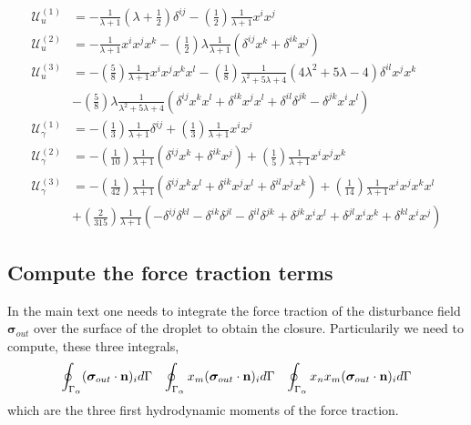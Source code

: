 \begin{align*}
    \mathcal{U}_{u}^{(1)}
    &=
    -\frac{1}{\lambda + 1}\left(\lambda + \frac{1}{2}\right)\delta^{ij} - \left(\frac{1}{2}\right)\frac{1}{\lambda + 1}x{}^{i}x{}^{j}
    \\ \mathcal{U}_{u}^{(2)}
    &=
    -\frac{1}{\lambda + 1}x{}^{i}x{}^{j}x{}^{k}  - \left(\frac{1}{2}\right)\lambda\frac{1}{\lambda + 1}(\delta^{ij}x{}^{k} + \delta^{ik}x{}^{j})
    \\ \mathcal{U}_{u}^{(3)}
    &=
    - \left(\frac{5}{8}\right)\frac{1}{\lambda + 1}x{}^{i}x{}^{j}x{}^{k}x{}^{l} 
    - \left(\frac{1}{8}\right)\frac{1}{\lambda^{2} + 5 \lambda + 4}\left(4 \lambda^{2} + 5 \lambda - 4\right)\delta^{il}x{}^{j}x{}^{k} \\
    &- \left(\frac{5}{8}\right)\lambda\frac{1}{\lambda^{2} + 5 \lambda + 4}(\delta^{ij}x{}^{k}x{}^{l} + \delta^{ik}x{}^{j}x{}^{l} + \delta^{il}\delta^{jk} - \delta^{jk}x{}^{i}x{}^{l}) 
    \\ \mathcal{U}_{\gamma}^{(1)}
    &=
    -\left(\frac{1}{3}\right)\frac{1}{\lambda + 1}\delta^{ij} 
    + \left(\frac{1}{3}\right)\frac{1}{\lambda + 1}x{}^{i}x{}^{j}
    \\ \mathcal{U}_{\gamma}^{(2)}
    &=
    - \left(\frac{1}{10}\right)\frac{1}{\lambda + 1}(\delta^{ij}x{}^{k} + \delta^{ik}x{}^{j}) 
    + \left(\frac{1}{5}\right)\frac{1}{\lambda + 1}x{}^{i}x{}^{j}x{}^{k}
    \\ \mathcal{U}_{\gamma}^{(3)}
    &=
    -\left(\frac{1}{42}\right)\frac{1}{\lambda + 1}(\delta^{ij}x{}^{k}x{}^{l} 
     + \delta^{ik}x{}^{j}x{}^{l} 
     + \delta^{il}x{}^{j}x{}^{k} )
    + \left(\frac{1}{14}\right)\frac{1}{\lambda + 1}x{}^{i}x{}^{j}x{}^{k}x{}^{l} \\
    &+ \left(\frac{2}{315}\right)\frac{1}{\lambda + 1}(
    -\delta^{ij}\delta^{kl} 
    - \delta^{ik}\delta^{jl} 
    - \delta^{il}\delta^{jk} 
    + \delta^{jk}x{}^{i}x{}^{l} 
    + \delta^{jl}x{}^{i}x{}^{k} 
    + \delta^{kl}x{}^{i}x{}^{j})
\end{align*}

\subsection{Compute the force traction terms}

In the main text one needs to integrate the force traction of the disturbance field $\bm\sigma_{out}$ over the surface of the droplet to obtain the closure. 
Particularily we need to compute, these three integrals, 
\begin{align*}
    \oint_{\Gamma_{\alpha}} (\bm\sigma_{out}\cdot \textbf{n})_i d\Gamma
    && \oint_{\Gamma_{\alpha}} x_m (\bm\sigma_{out}\cdot \textbf{n})_i d\Gamma
    && \oint_{\Gamma_{\alpha}} x_n x_m (\bm\sigma_{out}\cdot \textbf{n})_i d\Gamma
\end{align*}
which are the three first hydrodynamic moments of the force traction. 

